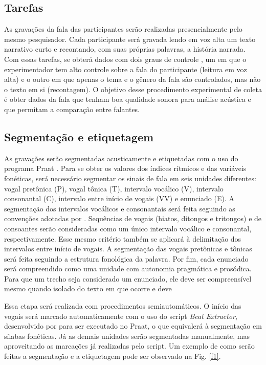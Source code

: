 \documentclass[12pt,a4paper,oneside]{article}
\begin{document}
	\subsection{Tarefas}

	As gravações da fala das participantes serão realizadas presencialmente pelo mesmo
	pesquisador. Cada participante será gravada lendo em voz alta um texto narrativo curto e
	recontando, com suas próprias palavras, a história narrada. Com essas tarefas, se
	obterá dados com dois graus de controle \citep{Barbosa2012}, um em que o experimentador tem
	alto controle sobre a fala do participante (leitura em voz alta) e o outro em que apenas o
	tema e o gênero da fala são controlados, mas não o texto em si (recontagem). O objetivo
	desse procedimento experimental de coleta é obter dados da fala que tenham boa qualidade
	sonora para análise acústica e que permitam a comparação entre falantes.

	\subsection{Segmentação e etiquetagem}

	As gravações serão segmentadas acusticamente e etiquetadas com o uso do programa
	Praat \citep{Boersma.Weenink2019}. Para se obter os valores dos índices rítmicos e
	das variáveis fonéticas, será necessário segmentar os sinais de fala em
	seis unidades diferentes: vogal pretônica (P), vogal tônica (T), intervalo vocálico
	(V), intervalo consonantal (C), intervalo entre início de vogais (VV) e enunciado (E). A
	segmentação dos intervalos vocálicos e consonantais será feita seguindo as
	convenções adotadas por \citet{Ramus.etal1999}. Sequências de vogais (hiatos,
	ditongos e tritongos) e de consoantes serão consideradas como um único intervalo
	vocálico e consonantal, respectivamente. Esse mesmo critério também se aplicará à
	delimitação dos intervalos entre início de vogais. A segmentação das vogais pretônicas e
	tônicas será feita seguindo a estrutura fonológica da palavra. Por fim, cada enunciado será
	compreendido como uma unidade com autonomia pragmática e prosódica. Para que um trecho seja
	considerado um enunciado, ele deve ser compreensível mesmo quando isolado do texto em que
	ocorre e deve 

	Essa etapa será realizada com procedimentos semiautomáticos. O início das vogais será
	marcado automaticamente com o uso do script \emph{Beat Extractor}, desenvolvido por
	\citet{Barbosa2003} para ser executado no Praat, o que equivalerá à segmentação em sílabas
	fonéticas. Já as demais unidades serão segmentadas manualmente, mas aproveitando as
	marcações já realizadas pelo script. Um exemplo de como serão feitas a segmentação  e a
	etiquetagem pode ser observado na Fig. \ref{f1}.
\end{document}
